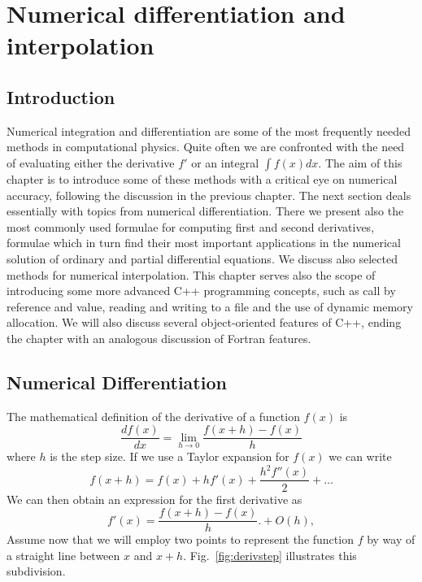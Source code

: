 
\chapter{Numerical differentiation and interpolation}\label{chap:differentiate}

\section{Introduction}
Numerical integration and differentiation
are some of the most frequently needed methods in computational
physics. Quite often we are confronted with the need of evaluating
either the derivative $f'$ or an integral  $\int f(x)dx$.  
The aim of this chapter is to introduce some of these methods
with a critical eye on numerical accuracy, following the discussion
in the previous chapter. 
 The next section deals essentially with topics from numerical differentiation.
There we present also the most commonly used formulae for computing
first and second derivatives, formulae which in turn find their most important
applications in the numerical solution of ordinary and partial 
differential equations. We discuss also selected methods for numerical 
interpolation. 
This  chapter serves also the scope of introducing
some more advanced C++ programming concepts, such as call
by reference and value, reading and writing to a file and the use
of dynamic memory allocation.  We will also discuss several object-oriented features of C++,
ending the chapter with an analogous discussion of Fortran features.

\section{Numerical Differentiation}
%
The mathematical definition of the derivative of a function $f(x)$ is
%
\[
    \frac{df(x)}{dx}=\lim_{h\rightarrow 0} \frac{f(x+h)-f(x)}{h}
\]
%
where $h$ is the step size. If we use a Taylor expansion for
$f(x)$ we can write
%
\[
  f(x+h)=f(x)+hf'(x)+\frac{h^2f''(x)}{2} +\dots
\]
%
We can then obtain an expression for    the first derivative as
%
\[
    f'(x) =\frac{f(x+h)-f(x)}{h}.
                    +O(h), 
\]
%
Assume now that we will employ two points to represent the
function $f$ by way of a straight line between $x$ and $x+h$.
Fig.~\ref{fig:derivstep} illustrates this subdivision. 

